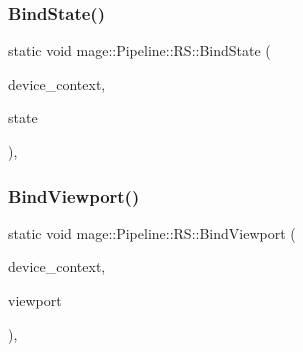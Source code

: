 \hypertarget{structmage_1_1_pipeline_1_1_r_s_a247899ff60b64d61f240b89312904c91}{}\label{structmage_1_1_pipeline_1_1_r_s_a247899ff60b64d61f240b89312904c91} 
\subsubsection{\texorpdfstring{Bind\+State()}{BindState()}}
{\footnotesize\ttfamily static void mage\+::\+Pipeline\+::\+R\+S\+::\+Bind\+State (\begin{DoxyParamCaption}\item[{I\+D3\+D11\+Device\+Context4 $\ast$}]{device\+\_\+context,  }\item[{I\+D3\+D11\+Rasterizer\+State $\ast$}]{state }\end{DoxyParamCaption})\hspace{0.3cm}{\ttfamily [static]}, {\ttfamily [noexcept]}}

\hypertarget{structmage_1_1_pipeline_1_1_r_s_aacab4adaa1314bd95fb6197fbfa728a9}{}\label{structmage_1_1_pipeline_1_1_r_s_aacab4adaa1314bd95fb6197fbfa728a9} 
\subsubsection{\texorpdfstring{Bind\+Viewport()}{BindViewport()}}
{\footnotesize\ttfamily static void mage\+::\+Pipeline\+::\+R\+S\+::\+Bind\+Viewport (\begin{DoxyParamCaption}\item[{I\+D3\+D11\+Device\+Context4 $\ast$}]{device\+\_\+context,  }\item[{const D3\+D11\+\_\+\+V\+I\+E\+W\+P\+O\+RT $\ast$}]{viewport }\end{DoxyParamCaption})\hspace{0.3cm}{\ttfamily [static]}, {\ttfamily [noexcept]}}

\hypertarget{structmage_1_1_pipeline_1_1_r_s_ab3bc6bbb80b4e74a07a9c041253adbf9}{}\label{structmage_1_1_pipeline_1_1_r_s_ab3bc6bbb80b4e74a07a9c041253adbf9} 
